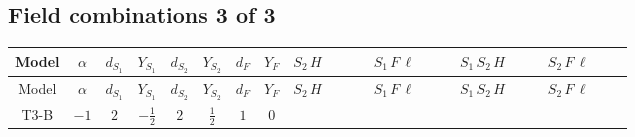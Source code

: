 \documentclass[8pt]{article}
\begin{document}
\begin{landscape}
\subsection*{Field combinations 3 of 3}
\begin{longtable}{@{}cccccccc >{\raggedright\arraybackslash}p{0.18\linewidth} >{\raggedright\arraybackslash}p{0.18\linewidth} >{\raggedright\arraybackslash}p{0.18\linewidth} >{\raggedright\arraybackslash}p{0.18\linewidth}@{}}
\toprule
Model & $\alpha$ & $d_{S_1}$ & $Y_{S_1}$ & $d_{S_2}$ & $Y_{S_2}$ & $d_F$ & $Y_F$ & $S_2\,H$ & $S_1\,F\,\ell$ & $S_1\,S_2\,H$ & $S_2\,F\,\ell$ \\
\midrule
\endfirsthead
\toprule
Model & $\alpha$ & $d_{S_1}$ & $Y_{S_1}$ & $d_{S_2}$ & $Y_{S_2}$ & $d_F$ & $Y_F$ & $S_2\,H$ & $S_1\,F\,\ell$ & $S_1\,S_2\,H$ & $S_2\,F\,\ell$ \\
\midrule
\endhead
T3-B & $-1$ & $2$ & $-\frac{1}{2}$ & $2$ & $\frac{1}{2}$ & $1$ & $0$ & \scriptsize\adjustbox{max width=\linewidth}{$\begin{gathered} +\text{lambdaH2Inv1} H_{a_3} \text{NewScalar2}_{a_4} \text{T3HiggsPortal2CGInv1}_{a_1,a_3,a_2,a_4} H_{a_1}{}^{\dagger } \text{NewScalar2}_{a_2}{}^{\dagger } \\ +\text{lambdaH2Inv2} H_{a_3} \text{NewScalar2}_{a_4} \text{T3HiggsPortal2CGInv2}_{a_1,a_3,a_2,a_4} H_{a_1}{}^{\dagger } \text{NewScalar2}_{a_2}{}^{\dagger }\end{gathered}$} & \scriptsize\adjustbox{max width=\linewidth}{$\begin{gathered} +\overline{\ell _{a_1,i_1}}\, P_R\, N_{r_1} \text{NewScalar1}_{a_1} y_{1,i_1,r_1} \\ +\overline{y_{1,i_1,r_1}} N_{r_1}{}^T\, C\, P_L\, \ell _{a_1,i_1} \text{NewScalar1}_{a_1}{}^{\dagger }\end{gathered}$} & \scriptsize\adjustbox{max width=\linewidth}{$\begin{gathered} +\overline{\lambda _{\text{T3}}} \text{NewScalar2}_{a_1} \epsilon _{a_2,a_3} H_{a_1}{}^{\dagger } H_{a_2}{}^{\dagger } \text{NewScalar1}_{a_3}{}^{\dagger } \\ +H_{a_1} H_{a_2} \text{NewScalar1}_{a_3} \lambda _{\text{T3}} \bar{\epsilon }_{a_2,a_3} \text{NewScalar2}_{a_1}{}^{\dagger }\end{gathered}$} & \scriptsize\adjustbox{max width=\linewidth}{$\begin{gathered} +\overline{y_{2,i_1,r_1}} N_{r_1}{}^T\, C\, P_L\, \ell _{a_1,i_1} \text{NewScalar2}_{a_2} \bar{\epsilon }_{a_1,a_2} \\ +\overline{\ell _{a_2,i_1}}\, P_R\, N_{r_1} y_{2,i_1,r_1} \epsilon _{a_2,a_1} \text{NewScalar2}_{a_1}{}^{\dagger }\end{gathered}$} \\

\end{longtable}
\end{landscape}
\end{document}

